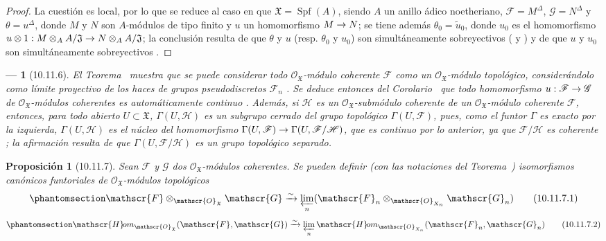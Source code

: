 \documentclass[oneside]{amsart}
\theoremstyle{ega-env-style}
\newtheorem*{env}{---}
\theoremstyle{ega-thm-env-style}
\newtheorem*{proposition}{Proposición}
\theoremstyle{ega-defn-env-style}
\renewcommand{\to}{\mathchoice{\longrightarrow}{\rightarrow}{\rightarrow}{\rightarrow}}
\newcommand{\oldpage}[2][]{{\marginnote{\normalfont{\textbf{#1}~|~#2}}}\ignorespaces}
\let\EGAOriginalLabel\label
\renewcommand{\label}[1]{\phantomsection\EGAOriginalLabel{#1}}
\begin{document}
\begin{proof}
La cuestión es local, por lo que se reduce al caso en que $\mathfrak{X}=\operatorname{Spf}(A)$, siendo $A$ un anillo ádico noetheriano, $\mathscr{F}=M^\Delta$, $\mathscr{G}=N^\Delta$ y $\theta=u^\Delta$, donde $M$ y $N$ son $A$-módulos de tipo finito y $u$ un homomorfismo $M\to N$; se tiene además $\theta_0=\widetilde{u}_0$, donde $u_0$ es el homomorfismo $u\otimes1:M\otimes_A A/\mathfrak{J}\to
N\otimes_A A/\mathfrak{J}$; la conclusión resulta de que $\theta$ y $u$ (resp. $\theta_0$ y $u_0$) son simultáneamente sobreyectivos ( y ) y de que $u$ y $u_0$ son simultáneamente sobreyectivos .
\end{proof}

\begin{env}[10.11.6]
\label{I.10.11.6}
El Teorema~ muestra que se puede considerar todo $\mathscr{O}_{\mathfrak{X}}$-módulo coherente $\mathscr{F}$ como un $\mathscr{O}_{\mathfrak{X}}$-\emph{módulo topológico}, considerándolo como límite proyectivo de los haces de grupos \emph{pseudodiscretos} $\mathscr{F}_n$ .
Se deduce entonces del Corolario~ que todo homomorfismo $u:\mathscr{F}\to\mathscr{G}$ de $\mathscr{O}_{\mathfrak{X}}$-módulos coherentes es automáticamente \emph{continuo}
\oldpage[I]{205}
.
Además, si $\mathscr{H}$ es un $\mathscr{O}_{\mathfrak{X}}$-submódulo coherente de un $\mathscr{O}_{\mathfrak{X}}$-módulo coherente $\mathscr{F}$, entonces, para todo abierto $U\subset\mathfrak{X}$, $\Gamma(U,\mathscr{H})$ es un subgrupo \emph{cerrado} del grupo topológico $\Gamma(U,\mathscr{F})$, pues, como el funtor $\Gamma$ es exacto por la izquierda, $\Gamma(U,\mathscr{H})$ es el núcleo del homomorfismo $\Gamma(U,\mathscr{F})\to\Gamma(U,\mathscr{F}/\mathscr{H})$, que es \emph{continuo} por lo anterior, ya que $\mathscr{F}/\mathscr{H}$ es coherente ; la afirmación resulta de que $\Gamma(U,\mathscr{F}/\mathscr{H})$ es un grupo topológico separado.
\end{env}

\begin{proposition}[10.11.7]
\label{I.10.11.7}
Sean $\mathscr{F}$ y $\mathscr{G}$ dos $\mathscr{O}_{\mathfrak{X}}$-módulos coherentes.
Se pueden definir \textup{(con las notaciones del Teorema~)} isomorfismos canónicos funtoriales de $\mathscr{O}_{\mathfrak{X}}$-módulos topológicos 
\[
  \label{I.10.11.7.1-fr}
  \mathscr{F}\otimes_{\mathscr{O}_{\mathfrak{X}}}\mathscr{G}
  \xrightarrow{\sim}
  \varprojlim_n
  (\mathscr{F}_n\otimes_{\mathscr{O}_{X_n}}\mathscr{G}_n)
  \tag{10.11.7.1}
\]
\[
  \label{I.10.11.7.2-fr}
  \mathscr{H}\!om_{\mathscr{O}_{\mathfrak{X}}}
  (\mathscr{F},\mathscr{G})
  \xrightarrow{\sim}
  \varprojlim_n
  \mathscr{H}\!om_{\mathscr{O}_{X_n}}(\mathscr{F}_n,\mathscr{G}_n)
  \tag{10.11.7.2}
\]
\end{proposition}
\end{document}
